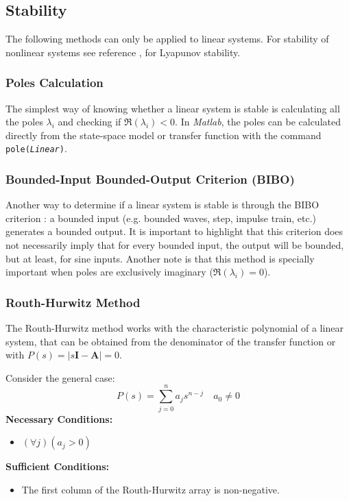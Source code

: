\subsection{Stability}
The following methods can only be applied to linear systems. For stability of nonlinear systems see reference \cite[Ch. 13]{dahleh2004lectures}, for Lyapunov stability.
\subsubsection{Poles Calculation}
The simplest way of knowing whether a linear system is stable is calculating all the poles $\lambda_i$ and checking if $\Re(\lambda_i)<0$. In \textit{Matlab}, the poles can be calculated directly from the state-space model or transfer function with the command \texttt{pole(\textit{Linear})}.

\subsubsection{Bounded-Input Bounded-Output Criterion (BIBO)}
Another way to determine if a linear system is stable is through the BIBO criterion \cite[Pag. 170]{antsaklis2007linear}: a bounded input (e.g. bounded waves, step, impulse train, etc.) generates a bounded output. It is important to highlight that this criterion does not necessarily imply that for every bounded input, the output will be bounded, but at least, for sine inputs. Another note is that this method is specially important when poles are exclusively imaginary ($\Re(\lambda_i)=0$).

\subsubsection{Routh-Hurwitz Method}
The Routh-Hurwitz method works with the characteristic polynomial of a linear system, that can be obtained from the denominator of the transfer function or with $P(s)=|s\mathbf{I}-\mathbf{A}|=0$.

Consider the general case:
\begin{equation}
    P(s)=\sum_{j=0}^na_js^{n-j}\quad a_0\neq0
\end{equation}
\textbf{Necessary Conditions:}
\begin{itemize}
    \item $(\forall j)(a_j>0)$
\end{itemize}
\textbf{Sufficient Conditions:}
\begin{itemize}
    \item The first column of the Routh-Hurwitz array is non-negative.
\end{itemize}

